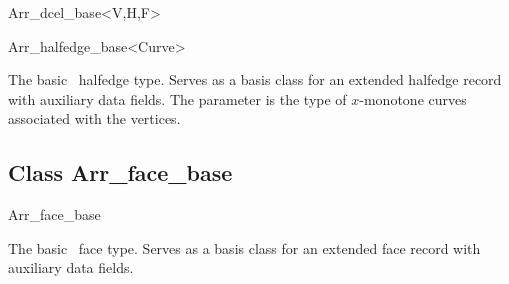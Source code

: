 \begin{ccRefClass}{Arr_dcel_base<V,H,F>}
\begin{ccClass}{Arr_halfedge_base<Curve>}

\ccDefinition

The basic \dcel\ halfedge type. Serves as a basis class for an
extended halfedge record with auxiliary data fields. The 
parameter is the type of $x$-monotone curves associated with the vertices.

\ccIsModel

\end{ccClass}


\subsection*{Class Arr\_face\_base}

\begin{ccClass}{Arr_face_base}

\ccDefinition

The basic \dcel\ face type. Serves as a basis class for an extended
face record with auxiliary data fields.

\ccIsModel

\end{ccClass}


\end{ccRefClass}

\ccRefPageEnd
